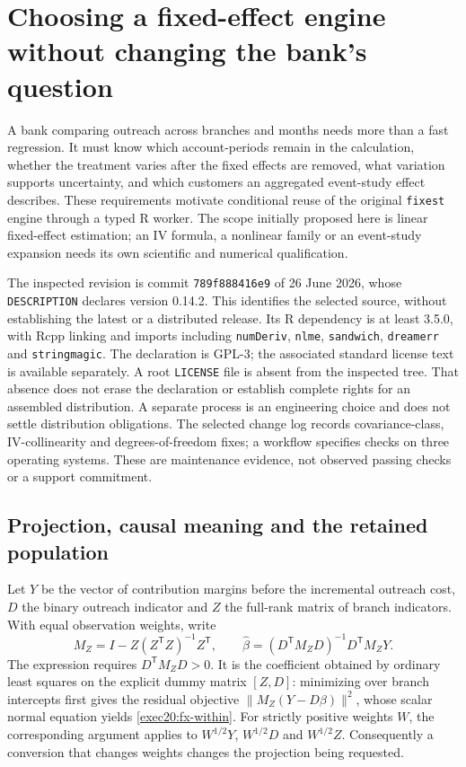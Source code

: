 \section{Choosing a fixed-effect engine without changing the bank's question}
\label{exec20:fx-scope}
A bank comparing outreach across branches and months needs more than a fast
regression. It must know which account-periods remain in the calculation, whether
the treatment varies after the fixed effects are removed, what variation supports
uncertainty, and which customers an aggregated event-study effect describes.
These requirements motivate conditional reuse of the original \texttt{fixest}
engine through a typed R worker. The scope initially proposed here is linear
fixed-effect estimation; an IV formula, a nonlinear family or an event-study
expansion needs its own scientific and numerical qualification.

The inspected revision is commit \texttt{789f888416e9} of 26 June 2026, whose
\texttt{DESCRIPTION} declares version 0.14.2. This identifies the selected source,
without establishing the latest or a distributed release. Its R dependency is
at least 3.5.0, with Rcpp linking and imports including \texttt{numDeriv},
\texttt{nlme}, \texttt{sandwich}, \texttt{dreamerr} and \texttt{stringmagic}.
The declaration is GPL-3; the associated standard license text is available
separately. A root \texttt{LICENSE} file is absent from the inspected tree.
That absence does not erase the declaration or establish complete rights for
an assembled distribution. A separate process is an engineering choice and
does not settle distribution obligations. The selected change log records
covariance-class, IV-collinearity and degrees-of-freedom fixes; a workflow
specifies checks on three operating systems. These are maintenance evidence,
not observed passing checks or a support commitment.\citep{exec20_fixest_source}

\subsection{Projection, causal meaning and the retained population}
\label{exec20:fx-projection}
Let $Y$ be the vector of contribution margins before the incremental outreach
cost, $D$ the binary outreach indicator and $Z$ the full-rank matrix of branch
indicators. With equal observation weights, write
\begin{equation}
 M_Z=I-Z(Z^{\mathsf T}Z)^{-1}Z^{\mathsf T},\qquad
 \widehat\beta=(D^{\mathsf T}M_ZD)^{-1}D^{\mathsf T}M_ZY.
 \label{exec20:fx-within}
\end{equation}
The expression requires $D^{\mathsf T}M_ZD>0$. It is the coefficient obtained
by ordinary least squares on the explicit dummy matrix $[Z,D]$: minimizing
over branch intercepts first gives the residual objective
$\|M_Z(Y-D\beta)\|^2$, whose scalar normal equation yields
\eqref{exec20:fx-within}. For strictly positive weights $W$, the corresponding
argument applies to $W^{1/2}Y$, $W^{1/2}D$ and $W^{1/2}Z$. Consequently a
conversion that changes weights changes the projection being requested.

